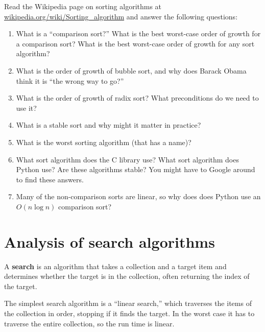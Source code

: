 \documentclass[10pt]{book}
\begin{document}
\begin{exercise}

Read the Wikipedia page on sorting algorithms at
\url{wikipedia.org/wiki/Sorting_algorithm} and answer
the following questions:

\begin{enumerate}

\item What is a ``comparison sort?'' What is the best worst-case order
  of growth for a comparison sort?  What is the best worst-case order
  of growth for any sort algorithm?

\item What is the order of growth of bubble sort, and why does Barack
  Obama think it is ``the wrong way to go?''

\item What is the order of growth of radix sort?  What preconditions
  do we need to use it?

\item What is a stable sort and why might it matter in practice?

\item What is the worst sorting algorithm (that has a name)?

\item What sort algorithm does the C library use?  What sort algorithm
  does Python use?  Are these algorithms stable?  You might have to
  Google around to find these answers.

\item Many of the non-comparison sorts are linear, so why does does
  Python use an $O(n \log n)$ comparison sort?

\end{enumerate}

\end{exercise}


\section{Analysis of search algorithms}

A {\bf search} is an algorithm that takes a collection and a target
item and determines whether the target is in the collection, often
returning the index of the target.

The simplest search algorithm is a ``linear search,'' which traverses
the items of the collection in order, stopping if it finds the target.
In the worst case it has to traverse the entire collection, so the run
time is linear.
\end{document}
